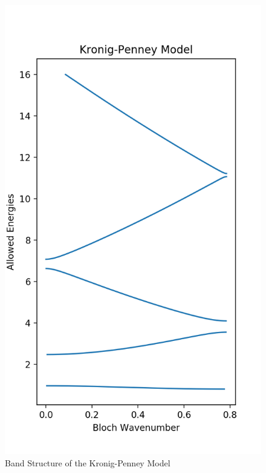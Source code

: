 \documentclass[a4paper,twoside]{article}
\begin{document}
\begin{figure}[h]
    \centering
    \includegraphics{plot_hw9_2c.png}
    \caption{Band Structure of the Kronig-Penney Model}
    \label{fig:band_structure_of_the_kronig_penney_model}
\end{figure}
\end{document}
